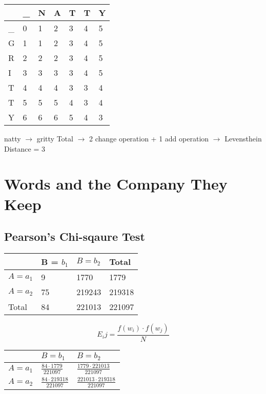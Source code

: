 \documentclass{article}
\begin{document}
	\begin{center}
	\begin{tabular} { | m{1cm} | m{1cm} | m{1cm} | m{1cm} | m{1cm} | m{1cm} | m{1cm} | }
		\hline
		 & \_ & N & A & T & T & Y \\
		\hline
		\_ & 0 & 1 & 2 & 3 & 4 & 5 \\
		\hline
		G & 1 & 1 & 2 & 3 & 4  & 5 \\
		\hline
		R & 2 & 2 & 2 & 3 & 4 & 5 \\
		\hline
		I & 3 & 3 & 3 & 3 & 4 & 5  \\
		\hline
		T & 4 & 4 & 4 & 3 & 3 & 4 \\
		\hline
		T & 5 & 5 & 5 & 4 & 3 & 4  \\
		\hline
		Y & 6 & 6 & 6 & 5 & 4 & 3  \\
		\hline
	\end{tabular}
	\end{center}
natty $\rightarrow$ gritty Total $\rightarrow$ 2 change operation + 1 add operation $\rightarrow$ Levensthein Distance = 3

\newpage
\section { Words and the Company They Keep }
	\subsection { Pearson's Chi-sqaure Test }
	\begin{center}
	\begin{tabular} { | m{2cm} | m{2cm} | m{2cm} | m{2cm} | }
		\hline
		 & B = $b_1$ & $B = b_2$ & Total \\
		\hline
		$A = a_1$ & 9 & 1770 & 1779  \\
		\hline
		$A = a_2$ & 75 & 219243 & 219318 \\
		\hline
		Total & 84 & 221013 & 221097 \\
		\hline
	\end{tabular}
	\end{center}

	\begin{equation*}
		 E_ij = \frac{f(w_i) \cdot f(w_j)}{N}
	\end{equation*}

\renewcommand{\arraystretch}{1.5}

	\begin{center}
	\begin{tabular} { | m{2cm} | m{2cm} | m{2cm} |  }
		\hline
		 & $B = b_1$ & $B = b_2$ \\
		\hline
		$A = a_1$ & $\frac{84 \cdot 1779}{221097}$ & $\frac{1779 \cdot 221013}{221097}$ \\
		\hline
		$A = a_2$ & $\frac{84 \cdot 219318}{221097}$ & $\frac{221013 \cdot 219318}{221097}$ \\
		\hline
	\end{tabular}
	\end{center}
\end{document}
